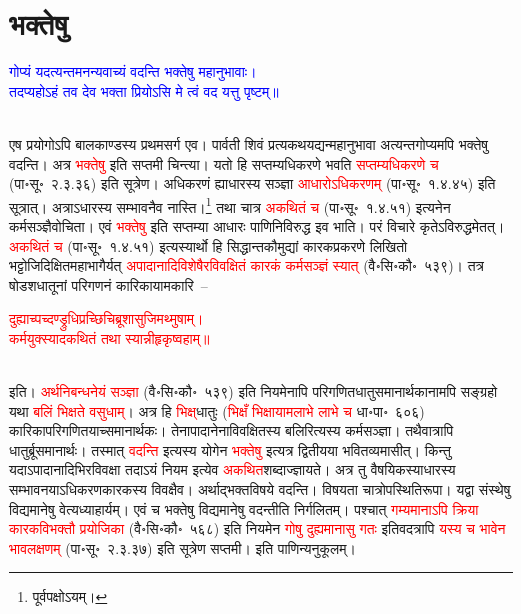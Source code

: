 \section[भक्तेषु]{भक्तेषु}
\centering\textcolor{blue}{गोप्यं यदत्यन्तमनन्यवाच्यं वदन्ति भक्तेषु महानुभावाः।\nopagebreak\\
तदप्यहोऽहं तव देव भक्ता प्रियोऽसि मे त्वं वद यत्तु पृष्टम्॥}\nopagebreak\\
\\
\begin{sloppypar}\justifying\noindent\hspace{10mm}\noindent\hspace{10mm} एष प्रयोगोऽपि बाल\-काण्डस्य प्रथम\-सर्ग एव। पार्वती शिवं प्रत्यकथयद्यन्महा\-नुभावा अत्यन्त\-गोप्यमपि भक्तेषु वदन्ति। अत्र \textcolor{red}{भक्तेषु} इति सप्तमी चिन्त्या। यतो हि सप्तम्यधिकरणे भवति \textcolor{red}{सप्तम्यधिकरणे च} (पा॰सू॰~२.३.३६) इति सूत्रेण। अधिकरणं ह्याधारस्य सञ्ज्ञा \textcolor{red}{आधारोऽधिकरणम्‌} (पा॰सू॰~१.४.४५) इति सूत्रात्। अत्राऽधारस्य सम्भावनैव नास्ति।\footnote{पूर्वपक्षोऽयम्।} तथा चात्र \textcolor{red}{अकथितं च} (पा॰सू॰~१.४.५१) इत्यनेन कर्म\-सञ्ज्ञैवोचिता। एवं \textcolor{red}{भक्तेषु} इति सप्तम्या आधारः पाणिनि\-विरुद्ध इव भाति। परं विचारे कृतेऽविरुद्धमेतत्। \textcolor{red}{अकथितं च} (पा॰सू॰~१.४.५१) इत्यस्यार्थो हि सिद्धान्त\-कौमुद्यां कारक\-प्रकरणे लिखितो भट्टोजिदिक्षित\-महाभागैर्यत् \textcolor{red}{अपादानादि\-विशेषैरविवक्षितं कारकं कर्म\-सञ्ज्ञं स्यात्‌} (वै॰सि॰कौ॰~५३९)। तत्र षोडश\-धातूनां परिगणनं कारिकायामकारि~–\end{sloppypar}
\centering\textcolor{red}{दुह्याच्पच्दण्ड्रुधिप्रच्छिचिब्रूशासुजिमथ्मुषाम्।\nopagebreak\\
कर्मयुक्स्यादकथितं तथा स्यान्नीहृकृष्वहाम्॥}\nopagebreak\\
\\
\begin{sloppypar}\justifying\noindent इति। \textcolor{red}{अर्थ\-निबन्धनेयं सञ्ज्ञा} (वै॰सि॰कौ॰~५३९) इति नियमेनापि परिगणित\-धातु\-समानार्थकानामपि सङ्ग्रहो यथा \textcolor{red}{बलिं भिक्षते वसुधाम्‌}। अत्र हि \textcolor{red}{भिक्ष्‌}\-धातुः (\textcolor{red}{भिक्षँ भिक्षायामलाभे लाभे च} धा॰पा॰~६०६) कारिका\-परिगणित\-याच्समानार्थकः। तेनापादानेनाविवक्षितस्य बलिरित्यस्य कर्म\-सञ्ज्ञा। तथैवात्रापि धातुर्ब्रू\-समानार्थः। तस्मात् \textcolor{red}{वदन्ति} इत्यस्य योगेन \textcolor{red}{भक्तेषु} इत्यत्र द्वितीयया भवितव्यमासीत्। किन्तु यदाऽपादानादिभिरविवक्षा तदाऽयं नियम इत्येव \textcolor{red}{अकथित}\-शब्दाज्ज्ञायते। अत्र तु वैषयिकस्याधारस्य सम्भावनयाऽधिकरण\-कारकस्य विवक्षैव। अर्थाद्भक्त\-विषये वदन्ति। विषयता चात्रोपस्थिति\-रूपा। यद्वा संस्थेषु विद्यमानेषु वेत्यध्याहार्यम्। एवं च भक्तेषु विद्यमानेषु वदन्तीति निर्गलितम्। पश्चात् \textcolor{red}{गम्यमानाऽपि क्रिया कारक\-विभक्तौ प्रयोजिका} (वै॰सि॰कौ॰~५६८) इति नियमेन \textcolor{red}{गोषु दुह्यमानासु गतः} इतिवदत्रापि \textcolor{red}{यस्य च भावेन भाव\-लक्षणम्‌} (पा॰सू॰~२.३.३७) इति सूत्रेण सप्तमी। इति पाणिन्यनुकूलम्।\end{sloppypar}

